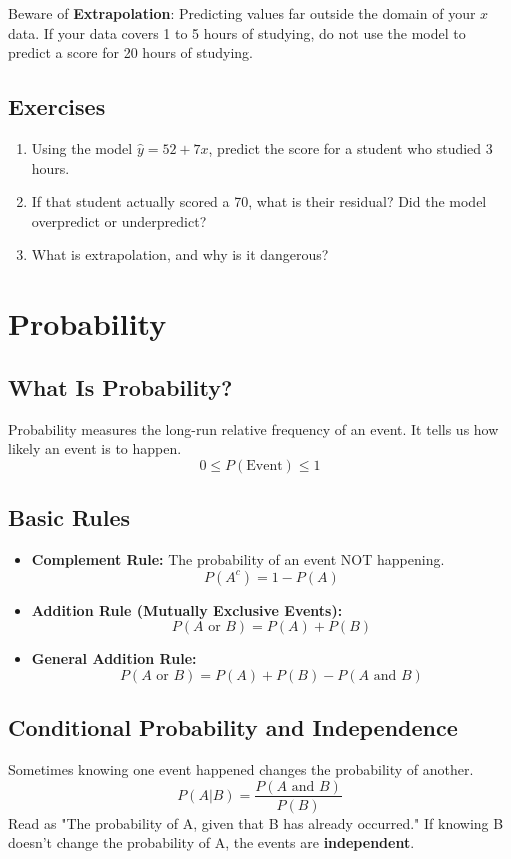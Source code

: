 \documentclass[11pt,openany]{book}
\begin{document}
\begin{mistakealert}
Beware of \textbf{Extrapolation}: Predicting values far outside the domain of your $x$ data. If your data covers 1 to 5 hours of studying, do not use the model to predict a score for 20 hours of studying.
\end{mistakealert}

\section{Exercises}
\begin{enumerate}
    \item Using the model $\hat{y} = 52 + 7x$, predict the score for a student who studied 3 hours.
    \item If that student actually scored a 70, what is their residual? Did the model overpredict or underpredict?
    \item What is extrapolation, and why is it dangerous?
\end{enumerate}

\chapter{Probability}

\section{What Is Probability?}
Probability measures the long-run relative frequency of an event. It tells us how likely an event is to happen.
\[
0 \leq P(\text{Event}) \leq 1
\]

\section{Basic Rules}
\begin{itemize}
    \item \textbf{Complement Rule:} The probability of an event NOT happening.
    \[ P(A^c) = 1 - P(A) \]
    \item \textbf{Addition Rule (Mutually Exclusive Events):}
    \[ P(A \text{ or } B) = P(A) + P(B) \]
    \item \textbf{General Addition Rule:}
    \[ P(A \text{ or } B) = P(A) + P(B) - P(A \text{ and } B) \]
\end{itemize}

\section{Conditional Probability and Independence}
Sometimes knowing one event happened changes the probability of another.
\[
P(A|B) = \frac{P(A \text{ and } B)}{P(B)}
\]
Read as "The probability of A, given that B has already occurred." If knowing B doesn't change the probability of A, the events are \textbf{independent}.
\end{document}

